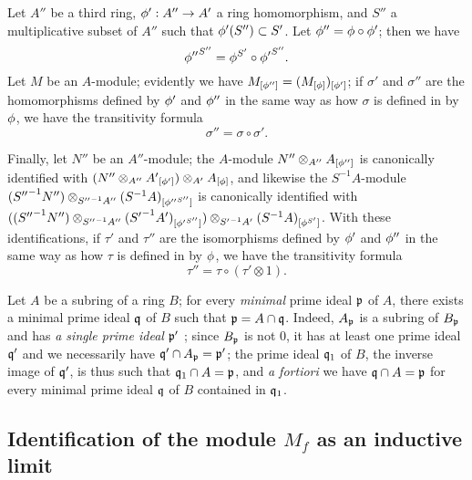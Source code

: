 \begin{env}[1.5.7]
\label{0.1.5.7}
Let $A''$ be a third ring, $\vphi':A''\to A'$ a ring homomorphism, and $S''$ a
multiplicative subset of $A''$ such that $\phi'(S'')\subset S'$. Let
$\phi''=\phi\circ\phi'$; then we have
\[
  {\phi''}^{S''}=\phi^{S'}\circ{\phi'}^{S''}.
\]
Let $M$ be an $A$-module; evidently we have
$M_{[\phi'']}=(M_{[\phi]})_{[\phi']}$; if $\sigma'$ and $\sigma''$ are the
homomorphisms defined by $\phi'$ and $\phi''$ in the same way as how $\sigma$ is defined in
 by $\phi$, we have the transitivity formula
\[
  \sigma''=\sigma\circ\sigma'.
\]

Finally, let $N''$ be an $A''$-module; the $A$-module
$N''\otimes_{A''}A_{[\phi'']}$ is canonically identified with
$(N''\otimes_{A''}{A'}_{[\phi']})\otimes_{A'}A_{[\phi]}$, and likewise the
$S^{-1}A$-module
$({S''}^{-1}N'')\otimes_{{S''}^{-1}A''}(S^{-1}A)_{[{\phi''}^{S''}]}$ is
canonically identified with
$(({S''}^{-1}N'')\otimes_{{S''}^{-1}A''}({S'}^{-1}A')_{[{\phi'}^{S''}]})
  \otimes_{{S'}^{-1}A'}(S^{-1}A)_{[\phi^{S'}]}$. With these identifications, if
$\tau'$ and $\tau''$ are the isomorphisms defined by $\phi'$ and $\phi''$ in the same way as how
$\tau$ is defined in  by $\phi$, we have the transitivity
formula
\[
  \tau''=\tau\circ(\tau'\otimes 1).
\]
\end{env}

\begin{env}[1.5.8]
\label{0.1.5.8}
Let $A$ be a subring of a ring $B$; for every \emph{minimal} prime ideal
$\mathfrak{p}$ of $A$, there exists a minimal prime ideal $\mathfrak{q}$ of $B$
such that $\mathfrak{p}=A\cap\mathfrak{q}$. Indeed, $A_\mathfrak{p}$ is a
subring of $B_\mathfrak{p}$  and has \emph{a single prime
ideal $\mathfrak{p}'$} ; since $B_\mathfrak{p}$ is not
$0$, it has at least one prime ideal $\mathfrak{q}'$ and we necessarily have
$\mathfrak{q}'\cap A_\mathfrak{p}=\mathfrak{p}'$; the prime ideal
$\mathfrak{q}_1$ of $B$, the inverse image of $\mathfrak{q}'$, is thus such that
$\mathfrak{q}_1\cap A=\mathfrak{p}$, and \emph{a fortiori} we have
$\mathfrak{q}\cap A=\mathfrak{p}$ for every minimal prime ideal $\mathfrak{q}$
of $B$ contained in $\mathfrak{q}_1$.
\end{env}

\subsection{Identification of the module $M_f$ as an inductive limit}
\label{subsection-localization-as-inductive-limit}

